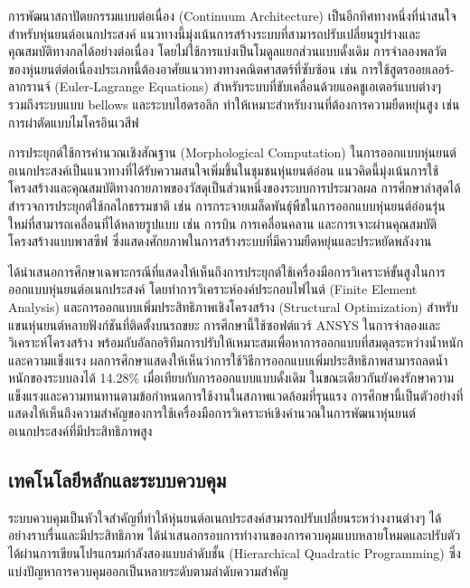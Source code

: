 \documentclass[a4paper]{article}
\begin{document}
การพัฒนาสถาปัตยกรรมแบบต่อเนื่อง (Continuum Architecture) เป็นอีกทิศทางหนึ่งที่น่าสนใจสำหรับหุ่นยนต์อเนกประสงค์ แนวทางนี้มุ่งเน้นการสร้างระบบที่สามารถปรับเปลี่ยนรูปร่างและคุณสมบัติทางกลได้อย่างต่อเนื่อง โดยไม่ใช้การแบ่งเป็นโมดูลแยกส่วนแบบดั้งเดิม \parencite{burgner2013continuum} การจำลองพลวัตของหุ่นยนต์ต่อเนื่องประเภทนี้ต้องอาศัยแนวทางทางคณิตศาสตร์ที่ซับซ้อน เช่น การใช้สูตรออยเลอร์-ลากรานจ์ (Euler-Lagrange Equations) สำหรับระบบที่ขับเคลื่อนด้วยแอคชูเอเตอร์แบบต่างๆ รวมถึงระบบแบบ bellows และระบบไฮดรอลิก ทำให้เหมาะสำหรับงานที่ต้องการความยืดหยุ่นสูง เช่น การผ่าตัดแบบไมโครอินเวสีฟ

การประยุกต์ใช้การคำนวณเชิงสัณฐาน (Morphological Computation) ในการออกแบบหุ่นยนต์อเนกประสงค์เป็นแนวทางที่ได้รับความสนใจเพิ่มขึ้นในชุมชนหุ่นยนต์อ่อน \parencite{rus2015design} แนวคิดนี้มุ่งเน้นการใช้โครงสร้างและคุณสมบัติทางกายภาพของวัสดุเป็นส่วนหนึ่งของระบบการประมวลผล การศึกษาล่าสุดได้สำรวจการประยุกต์ใช้กลไกธรรมชาติ เช่น การกระจายเมล็ดพันธุ์พืชในการออกแบบหุ่นยนต์อ่อนรุ่นใหม่ที่สามารถเคลื่อนที่ได้หลายรูปแบบ เช่น การบิน การเคลื่อนคลาน และการเจาะผ่านคุณสมบัติโครงสร้างแบบพาสซีฟ ซึ่งแสดงศักยภาพในการสร้างระบบที่มีความยืดหยุ่นและประหยัดพลังงาน

\textcite{li2025finite} ได้นำเสนอการศึกษาเฉพาะกรณีที่แสดงให้เห็นถึงการประยุกต์ใช้เครื่องมือการวิเคราะห์ขั้นสูงในการออกแบบหุ่นยนต์อเนกประสงค์ โดยทำการวิเคราะห์องค์ประกอบไฟไนต์ (Finite Element Analysis) และการออกแบบเพิ่มประสิทธิภาพเชิงโครงสร้าง (Structural Optimization) สำหรับแขนหุ่นยนต์หลายฟังก์ชันที่ติดตั้งบนรถขยะ การศึกษานี้ใช้ซอฟต์แวร์ ANSYS ในการจำลองและวิเคราะห์โครงสร้าง พร้อมกับอัลกอริทึมการปรับให้เหมาะสมเพื่อหาการออกแบบที่สมดุลระหว่างน้ำหนักและความแข็งแรง ผลการศึกษาแสดงให้เห็นว่าการใช้วิธีการออกแบบเพิ่มประสิทธิภาพสามารถลดน้ำหนักของระบบลงได้ 14.28\% เมื่อเทียบกับการออกแบบแบบดั้งเดิม ในขณะเดียวกันยังคงรักษาความแข็งแรงและความทนทานตามข้อกำหนดการใช้งานในสภาพแวดล้อมที่รุนแรง การศึกษานี้เป็นตัวอย่างที่แสดงให้เห็นถึงความสำคัญของการใช้เครื่องมือการวิเคราะห์เชิงคำนวณในการพัฒนาหุ่นยนต์อเนกประสงค์ที่มีประสิทธิภาพสูง

\subsection{เทคโนโลยีหลักและระบบควบคุม}

ระบบควบคุมเป็นหัวใจสำคัญที่ทำให้หุ่นยนต์อเนกประสงค์สามารถปรับเปลี่ยนระหว่างงานต่างๆ ได้อย่างราบรื่นและมีประสิทธิภาพ \textcite{tassi2024multimodal} ได้นำเสนอกรอบการทำงานของการควบคุมแบบหลายโหมดและปรับตัวได้ผ่านการเขียนโปรแกรมกำลังสองแบบลำดับชั้น (Hierarchical Quadratic Programming) ซึ่งแบ่งปัญหาการควบคุมออกเป็นหลายระดับตามลำดับความสำคัญ
\end{document}
